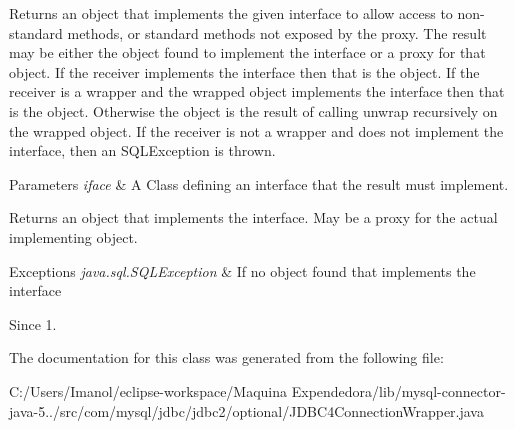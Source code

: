 Returns an object that implements the given interface to allow access to non-\/standard methods, or standard methods not exposed by the proxy. The result may be either the object found to implement the interface or a proxy for that object. If the receiver implements the interface then that is the object. If the receiver is a wrapper and the wrapped object implements the interface then that is the object. Otherwise the object is the result of calling {\ttfamily unwrap} recursively on the wrapped object. If the receiver is not a wrapper and does not implement the interface, then an {\ttfamily S\+Q\+L\+Exception} is thrown.


\begin{DoxyParams}{Parameters}
{\em iface} & A Class defining an interface that the result must implement. \\
\hline
\end{DoxyParams}
\begin{DoxyReturn}{Returns}
an object that implements the interface. May be a proxy for the actual implementing object. 
\end{DoxyReturn}

\begin{DoxyExceptions}{Exceptions}
{\em java.\+sql.\+S\+Q\+L\+Exception} & If no object found that implements the interface \\
\hline
\end{DoxyExceptions}
\begin{DoxySince}{Since}
1. 
\end{DoxySince}


The documentation for this class was generated from the following file\+:\begin{DoxyCompactItemize}
\item 
C\+:/\+Users/\+Imanol/eclipse-\/workspace/\+Maquina Expendedora/lib/mysql-\/connector-\/java-\/5../src/com/mysql/jdbc/jdbc2/optional/J\+D\+B\+C4\+Connection\+Wrapper.\+java\end{DoxyCompactItemize}
